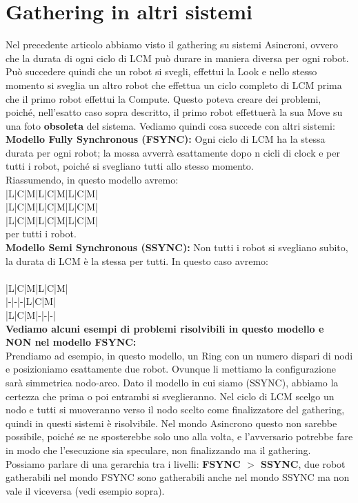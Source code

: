 \section{Gathering in altri sistemi}
Nel precedente articolo abbiamo visto il gathering su sistemi Asincroni, ovvero
che la durata di ogni ciclo di LCM può durare in maniera diversa per ogni robot.
Può succedere quindi che un robot si svegli, effettui la Look e nello stesso
momento si sveglia un altro robot che effettua un ciclo completo di LCM prima
che il primo robot effettui la Compute. Questo poteva creare dei problemi,
poiché, nell'esatto caso sopra descritto, il primo robot effettuerà la sua Move
su una foto \textbf{obsoleta} del sistema. Vediamo quindi cosa succede con altri
sistemi:\\

\textbf{Modello Fully Synchronous (FSYNC):} Ogni ciclo di LCM ha la stessa
durata per ogni robot; la mossa avverrà esattamente dopo n cicli di clock e per
tutti i robot, poiché si svegliano tutti allo stesso momento.\\
Riassumendo, in questo modello avremo:\\
|L|C|M|L|C|M|L|C|M|\\
|L|C|M|L|C|M|L|C|M|\\
|L|C|M|L|C|M|L|C|M|\\
per tutti i robot.\\

\textbf{Modello Semi Synchronous (SSYNC):} Non tutti i robot si svegliano
subito, la durata di LCM è la stessa per tutti. In questo caso avremo:\\\\
|L|C|M|L|C|M|\\
|-|-|-|L|C|M|\\
|L|C|M|-|-|-|\\

\textbf{Vediamo alcuni esempi di problemi risolvibili in questo modello e NON
    nel modello FSYNC:}\\
Prendiamo ad esempio, in questo modello, un Ring con un numero dispari di nodi e
posizioniamo esattamente due robot. Ovunque li mettiamo la configurazione sarà
simmetrica nodo-arco. Dato il modello in cui siamo (SSYNC), abbiamo la certezza
che prima o poi entrambi si sveglieranno. Nel ciclo di LCM scelgo un nodo e
tutti si muoveranno verso il nodo scelto come finalizzatore del gathering,
quindi in questi sistemi è risolvibile. Nel mondo Asincrono questo non sarebbe
possibile, poiché se ne sposterebbe solo uno alla volta, e l'avversario potrebbe
fare in modo che l'esecuzione sia speculare, non finalizzando ma il gathering.\\
Possiamo parlare di una gerarchia tra i livelli: \textbf{FSYNC $>$ SSYNC}, due
robot gatherabili nel mondo FSYNC sono gatherabili anche nel mondo SSYNC ma non
vale il viceversa (vedi esempio sopra).


